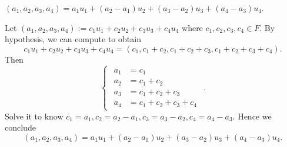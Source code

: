 \begin{Exercise}
\begin{answer}
$(a_1,a_2,a_3,a_4)=a_1 u_1 + (a_2-a_1) u_2 + (a_3-a_2) u_3 + (a_4-a_3) u_4$.
\end{answer}
\begin{solution}
Let $(a_1,a_2,a_3,a_4) := c_1 u_1 + c_2 u_2 + c_3 u_3 + c_4 u_4$ where $c_1, c_2, c_3, c_4\in F$. By hypothesis, we can compute to obtain
$$
c_1 u_1 + c_2 u_2 + c_3 u_3 + c_4 u_4 = (c_1, c_1+c_2, c_1+c_2+c_3,c_1+c_2+c_3+c_4).
$$
Then
$$
\begin{cases}
\begin{aligned}
a_1 &= c_1 \\
a_2 &= c_1+c_2 \\
a_3 &= c_1+c_2+c_3 \\
a_4 &= c_1+c_2+c_3+c_4
\end{aligned}
\end{cases}.
$$
Solve it to know $c_1 = a_1, c_2 = a_2-a_1, c_3 = a_3-a_2, c_4 = a_4-a_3$. Hence we conclude 
$$
(a_1,a_2,a_3,a_4)=a_1 u_1 + (a_2-a_1) u_2 + (a_3-a_2) u_3 + (a_4-a_3) u_4.
$$
\end{solution}
\end{Exercise}